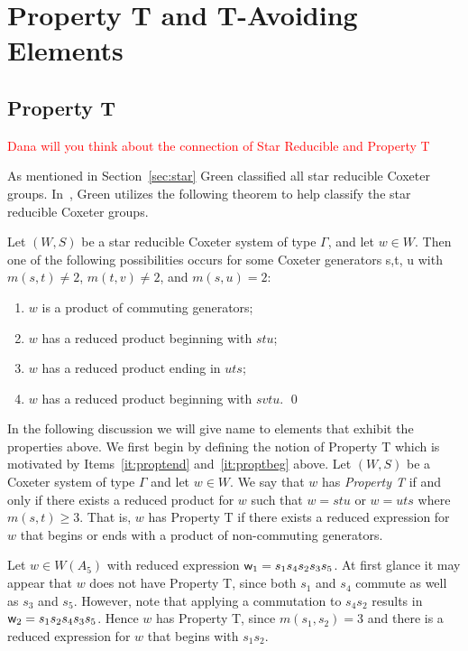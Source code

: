 \chapter{Property T and T-Avoiding Elements}\label{chap:TandTavoid}

\section{Property T}\label{Tavoid}

\textcolor{red}{Dana will you think about the connection of Star Reducible and Property T}

As mentioned in Section~\ref{sec:star} Green classified all star reducible Coxeter groups. In~\cite{Green2006a}, Green utilizes the following theorem to help classify the star reducible Coxeter groups. 
\begin{theorem}
	Let $(W,S)$ be a star reducible Coxeter system of type $\Gamma$, and let $w \in W$. Then one of the following possibilities occurs for some Coxeter generators s,t, u with $m(s,t) \neq 2$, $m(t,v) \neq 2$, and $m(s,u)=2$:
	\begin{enumerate}
	\item $w$ is a product of commuting generators;\label{it:triv}
	\item $w$ has a reduced product beginning with $stu$;\label{it:proptend}
	\item $w$ has a reduced product ending in $uts$;\label{it:proptbeg}
	\item $w$ has a reduced product beginning with $svtu$.\label{it:tavoid}	\qed
	\end{enumerate}
\end{theorem}

In the following discussion we will give name to elements that exhibit the properties above. We first begin by defining the notion of Property T which is motivated by Items~\ref{it:proptend} and~\ref{it:proptbeg} above. Let $(W,S)$ be a Coxeter system of type $\Gamma$ and let $w \in W$. We say that $w$ has \emph{Property T} if and only if there exists a reduced product for $w$ such that $w=stu$ or $w=uts$ where $m(s,t)\geq 3$. That is, $w$ has Property T if there exists a reduced expression for $w$ that begins or ends with a product of non-commuting generators. 

\begin{example}\label{ex:prop-T}
Let $w \in W(A_5)$ with reduced expression $\mathsf{w}_1=s_1s_4s_2s_3s_5$. At first glance it may appear that $w$ does not have Property T, since both $s_1$ and $s_4$ commute as well as $s_3$ and $s_5$. However, note that applying a commutation to $s_4s_2$ results in $\mathsf{w}_2=s_1s_2s_4s_3s_5$. Hence $w$ has Property T, since $m(s_1,s_2)=3$ and there is a reduced expression for $w$ that begins with $s_1s_2$.	
\end{example}

